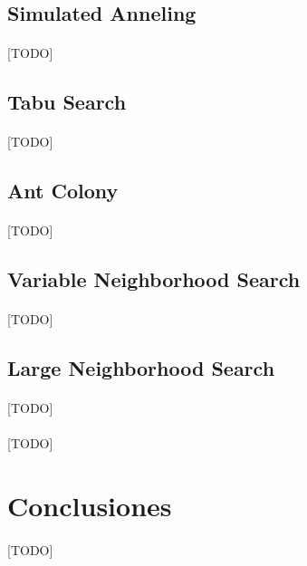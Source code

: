 \documentclass{subfiles}
\begin{document}
      \subsection{Simulated Anneling}
      \label{sec:solving_simulated_anneling}

        \paragraph{}
        [TODO]

      \subsection{Tabu Search}
      \label{sec:solving_tabu}

        \paragraph{}
        [TODO]

      \subsection{Ant Colony}
      \label{sec:solving_ant_colony}

        \paragraph{}
        [TODO]

      \subsection{Variable Neighborhood Search}
      \label{sec:solving_vns}

        \paragraph{}
        [TODO]

      \subsection{Large Neighborhood Search}
      \label{sec:solving_lns}

        \paragraph{}
        [TODO]

      \paragraph{}
      [TODO]

    \section{Conclusiones}
    \label{sec:solving_conclusions}

      \paragraph{}
      [TODO]
\end{document}
